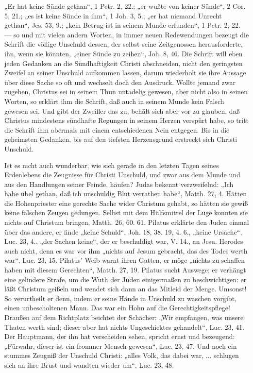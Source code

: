 „Er hat keine Sünde gethan“, 1 Petr. 2, 22.; „er wußte von keiner Sünde“, 2 Cor. 5, 21.; „es ist keine Sünde in ihm“, 1 Joh. 3, 5.; „er hat niemand Unrecht gethan“, Jes. 53, 9.; „kein Betrug ist in seinem Munde erfunden“, 1 Petr. 2, 22. — so und mit vielen andern Worten, in immer neuen Redewendungen bezeugt die Schrift die völlige Unschuld dessen, der selbst seine Zeitgenossen herausforderte, ihn, wenn sie könnten, „einer Sünde zu zeihen“, Joh. 8, 46. Die Schrift will eben jeden Gedanken an die Sündhaftigkeit Christi abschneiden, nicht den geringsten Zweifel an seiner Unschuld aufkommen lassen, darum wiederholt sie ihre Aussage über diese Sache so oft und wechselt doch den Ausdruck. Wollte jemand zwar zugeben, Christus sei in seinem Thun untadelig gewesen, aber nicht also in seinen Worten, so erklärt ihm die Schrift, daß auch in seinem Munde kein Falsch gewesen sei. Und gibt der Zweifler das zu, behält sich aber vor zu glauben, daß Christus mindestens sündhafte Regungen in seinem Herzen verspürt habe, so tritt die Schrift ihm abermals mit einem entschiedenen Nein entgegen. Bis in die geheimsten Gedanken, bis auf den tiefsten Herzensgrund erstreckt sich Christi Unschuld.

Ist es nicht auch wunderbar, wie sich gerade in den letzten Tagen seines Erdenlebens die Zeugnisse für Christi Unschuld, und zwar aus dem Munde und aus den Handlungen seiner Feinde, häufen? Judas bekennt verzweifelnd: „Ich habe übel gethan, daß ich unschuldig Blut verrathen habe“, Matth. 27, 4. Hätten die Hohenpriester eine gerechte Sache wider Christum gehabt, so hätten sie gewiß keine falschen Zeugen gedungen. Selbst mit dem Hülfsmittel der Lüge konnten sie nichts auf Christum bringen, Matth. 26, 60. 61. Pilatus erklärte den Juden einmal über das andere, er finde „keine Schuld“, Joh. 18, 38. 19, 4. 6., „keine Ursache“, Luc. 23, 4., „der Sachen keine“, der er beschuldigt war, V. 14., an Jesu. Herodes auch nicht, denn es war
vor ihm „nichts auf Jesum gebracht, das des Todes werth war“, Luc. 23, 15. Pilatus’ Weib warnt ihren Gatten, er möge „nichts zu schaffen haben mit diesem Gerechten“, Matth. 27, 19. Pilatus sucht Auswege; er verhängt eine gelindere Strafe, um die Wuth der Juden einigermaßen zu beschwichtigen: er läßt Christum geißeln und wendet sich dann an das Mitleid der Menge. Umsonst! So verurtheilt er denn, indem er seine Hände in Unschuld zu waschen vorgibt, einen unbescholtenen Mann. Das war ein Hohn auf die Gerechtigkeitspflege! Draußen auf dem Richtplatz beichtet der Schächer: „Wir empfangen, was unsere Thaten werth sind; dieser aber hat nichts Ungeschicktes gehandelt“, Luc. 23, 41. Der Hauptmann, der ihn hat verscheiden sehen, spricht ernst und bezeugend: „Fürwahr, dieser ist ein frommer Mensch gewesen“, Luc. 23, 47. Und noch ein stummes Zeugniß der Unschuld Christi: „alles Volk, das dabei war, ... schlugen sich an ihre Brust und wandten wieder um“, Luc. 23, 48.

